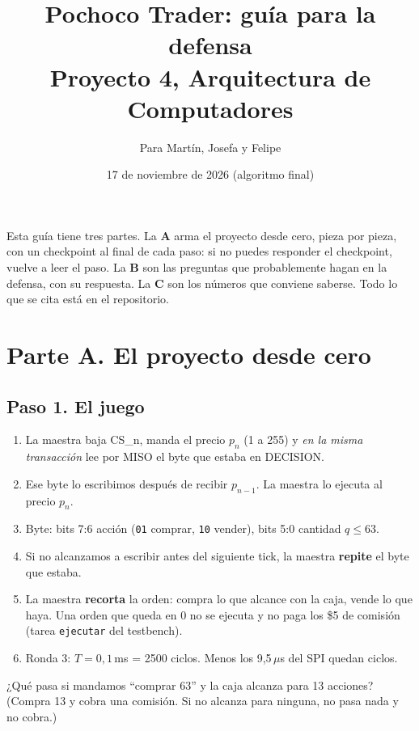 \documentclass[11pt,letterpaper]{article}
\title{\textbf{Pochoco Trader: guía para la defensa}\\[2pt]\large Proyecto 4, Arquitectura de Computadores}
\author{Para Martín, Josefa y Felipe}
\date{17 de noviembre de 2026 (algoritmo final)}
\newcounter{preg}
\begin{document}
\maketitle

\noindent Esta guía tiene tres partes. La \textbf{A} arma el proyecto desde cero, pieza por pieza, con
un checkpoint al final de cada paso: si no puedes responder el checkpoint, vuelve a leer el paso.
La \textbf{B} son las preguntas que probablemente hagan en la defensa, con su respuesta. La
\textbf{C} son los números que conviene saberse. Todo lo que se cita está en el repositorio.

\tableofcontents

\section*{Parte A. El proyecto desde cero}

\subsection*{Paso 1. El juego}
\begin{enumerate}
\item La maestra baja CS\_n, manda el precio $p_n$ (1 a 255) y \emph{en la misma transacción} lee
  por MISO el byte que estaba en DECISION.
\item Ese byte lo escribimos después de recibir $p_{n-1}$. La maestra lo ejecuta al precio $p_n$.
\item Byte: bits 7:6 acción (\texttt{01} comprar, \texttt{10} vender), bits 5:0 cantidad $q \le 63$.
\item Si no alcanzamos a escribir antes del siguiente tick, la maestra \textbf{repite} el byte que estaba.
\item La maestra \textbf{recorta} la orden: compra lo que alcance con la caja, vende lo que haya. Una
  orden que queda en 0 no se ejecuta y no paga los \$5 de comisión (tarea \texttt{ejecutar} del testbench).
\item Ronda 3: $T = 0{,}1$\,ms = 2500 ciclos. Menos los 9,5\,$\mu$s del SPI quedan \Presupuesto{} ciclos.
\end{enumerate}
\begin{checkpoint}
¿Qué pasa si mandamos ``comprar 63'' y la caja alcanza para 13 acciones? (Compra 13 y cobra una comisión.
Si no alcanza para ninguna, no pasa nada y no cobra.)
\end{checkpoint}
\end{document}
